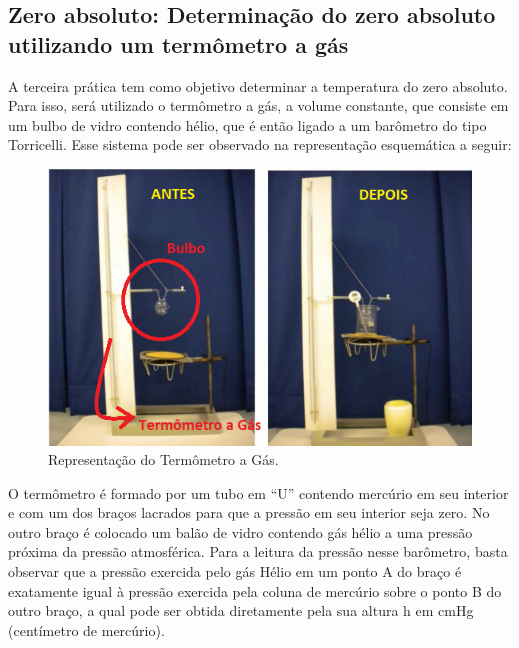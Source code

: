 \subsection{Zero absoluto: Determinação do zero absoluto utilizando um termômetro a
gás}

A terceira prática tem como objetivo determinar a temperatura do zero absoluto. Para isso, será utilizado o termômetro a gás, a volume constante, que consiste em um bulbo de vidro contendo hélio, que é então ligado a um barômetro do tipo Torricelli. Esse sistema pode ser observado na representação esquemática a seguir:

\begin{figure}[H]
  \centering
  \includegraphics[scale=0.9]{images/Termômetro a Gás.png}
  \caption{Representação do Termômetro a Gás.}
\end{figure}

O termômetro é formado por um tubo em “U” contendo mercúrio em seu interior e com um dos braços lacrados para que a pressão em seu interior seja zero. No outro braço é colocado um balão de vidro contendo gás hélio a uma pressão próxima da pressão atmosférica. Para a leitura da pressão nesse barômetro, basta observar que a pressão exercida pelo gás Hélio em um ponto A do braço é exatamente igual à pressão exercida pela coluna de mercúrio sobre o ponto B do outro braço, a qual pode ser obtida diretamente pela sua altura h em cmHg (centímetro de mercúrio).

